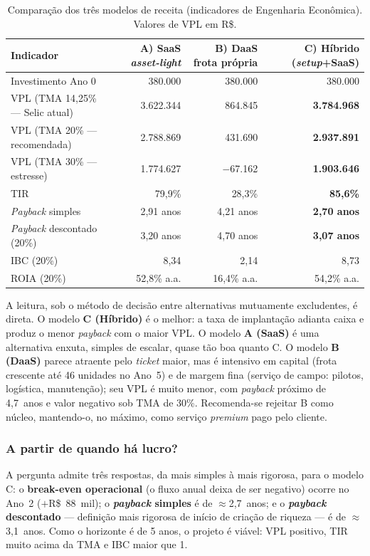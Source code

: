\documentclass[conference]{IEEEtran}
\newcommand{\rs}{R\$}
\begin{document}
\begin{table}[!t]
\caption{Comparação dos três modelos de receita (indicadores de Engenharia Econômica). Valores de VPL em \rs.}
\label{tab:comp}
\centering
\footnotesize
\begin{tabular}{@{}lrrr@{}}
\toprule
\textbf{Indicador} & \textbf{A) SaaS \textit{asset-light}} & \textbf{B) DaaS frota própria} & \textbf{C) Híbrido (\textit{setup}+SaaS)} \\
\midrule
Investimento Ano 0 & 380.000 & 380.000 & 380.000 \\
VPL (TMA 14,25\% --- Selic atual) & 3.622.344 & 864.845 & \textbf{3.784.968} \\
VPL (TMA 20\% --- recomendada) & 2.788.869 & 431.690 & \textbf{2.937.891} \\
VPL (TMA 30\% --- estresse) & 1.774.627 & $-$67.162 & \textbf{1.903.646} \\
TIR & 79,9\% & 28,3\% & \textbf{85,6\%} \\
\textit{Payback} simples & 2,91 anos & 4,21 anos & \textbf{2,70 anos} \\
\textit{Payback} descontado (20\%) & 3,20 anos & 4,70 anos & \textbf{3,07 anos} \\
IBC (20\%) & 8,34 & 2,14 & 8,73 \\
ROIA (20\%) & 52,8\% a.a. & 16,4\% a.a. & 54,2\% a.a. \\
\bottomrule
\end{tabular}
\end{table}

A leitura, sob o método de decisão entre alternativas mutuamente excludentes, é direta. O modelo \textbf{C (Híbrido)} é o melhor: a taxa de implantação adianta caixa e produz o menor \textit{payback} com o maior VPL. O modelo \textbf{A (SaaS)} é uma alternativa enxuta, simples de escalar, quase tão boa quanto C. O modelo \textbf{B (DaaS)} parece atraente pelo \textit{ticket} maior, mas é intensivo em capital (frota crescente até 46 unidades no Ano~5) e de margem fina (serviço de campo: pilotos, logística, manutenção); seu VPL é muito menor, com \textit{payback} próximo de 4,7~anos e valor negativo sob TMA de 30\%. Recomenda-se rejeitar B como núcleo, mantendo-o, no máximo, como serviço \textit{premium} pago pelo cliente.

\subsubsection{A partir de quando há lucro?}
A pergunta admite três respostas, da mais simples à mais rigorosa, para o modelo C: o \textbf{break-even operacional} (o fluxo anual deixa de ser negativo) ocorre no Ano~2 ($+$\rs~88~mil); o \textbf{\textit{payback} simples} é de $\approx$2,7~anos; e o \textbf{\textit{payback} descontado} --- definição mais rigorosa de início de criação de riqueza --- é de $\approx$3,1~anos. Como o horizonte é de 5 anos, o projeto é viável: VPL positivo, TIR muito acima da TMA e IBC maior que 1.
\end{document}
